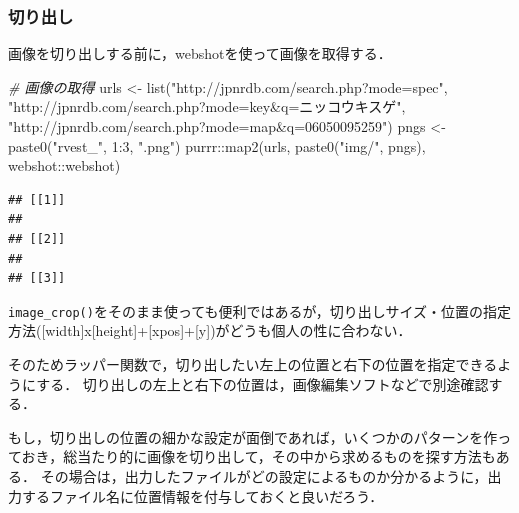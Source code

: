 \documentclass[
]{article}
\newenvironment{Shaded}{\begin{snugshade}}{\end{snugshade}}
\newcommand{\CommentTok}[1]{\textcolor[rgb]{0.56,0.35,0.01}{\textit{#1}}}
\newcommand{\DecValTok}[1]{\textcolor[rgb]{0.00,0.00,0.81}{#1}}
\newcommand{\FunctionTok}[1]{\textcolor[rgb]{0.00,0.00,0.00}{#1}}
\newcommand{\NormalTok}[1]{#1}
\newcommand{\OtherTok}[1]{\textcolor[rgb]{0.56,0.35,0.01}{#1}}
\newcommand{\SpecialCharTok}[1]{\textcolor[rgb]{0.00,0.00,0.00}{#1}}
\newcommand{\StringTok}[1]{\textcolor[rgb]{0.31,0.60,0.02}{#1}}
\begin{document}
\hypertarget{ux5207ux308aux51faux3057}{%
\subsubsection{切り出し}\label{ux5207ux308aux51faux3057}}

画像を切り出しする前に，webshotを使って画像を取得する．

\begin{Shaded}
\begin{Highlighting}[]
  \CommentTok{\# 画像の取得}
\NormalTok{urls }\OtherTok{\textless{}{-}} 
  \FunctionTok{list}\NormalTok{(}\StringTok{"http://jpnrdb.com/search.php?mode=spec"}\NormalTok{,}
       \StringTok{"http://jpnrdb.com/search.php?mode=key\&q=ニッコウキスゲ"}\NormalTok{,}
       \StringTok{"http://jpnrdb.com/search.php?mode=map\&q=06050095259"}\NormalTok{)}
\NormalTok{pngs }\OtherTok{\textless{}{-}} \FunctionTok{paste0}\NormalTok{(}\StringTok{"rvest\_"}\NormalTok{, }\DecValTok{1}\SpecialCharTok{:}\DecValTok{3}\NormalTok{, }\StringTok{".png"}\NormalTok{)}
\NormalTok{purrr}\SpecialCharTok{::}\FunctionTok{map2}\NormalTok{(urls, }\FunctionTok{paste0}\NormalTok{(}\StringTok{"img/"}\NormalTok{, pngs), webshot}\SpecialCharTok{::}\NormalTok{webshot)}
\end{Highlighting}
\end{Shaded}

\begin{verbatim}
## [[1]]
## 
## [[2]]
## 
## [[3]]
\end{verbatim}

\texttt{image\_crop()}をそのまま使っても便利ではあるが，切り出しサイズ・位置の指定方法({[}width{]}x{[}height{]}+{[}xpos{]}+{[}y{]})がどうも個人の性に合わない．

そのためラッパー関数で，切り出したい左上の位置と右下の位置を指定できるようにする．
切り出しの左上と右下の位置は，画像編集ソフトなどで別途確認する．

もし，切り出しの位置の細かな設定が面倒であれば，いくつかのパターンを作っておき，総当たり的に画像を切り出して，その中から求めるものを探す方法もある．
その場合は，出力したファイルがどの設定によるものか分かるように，出力するファイル名に位置情報を付与しておくと良いだろう．
\end{document}
